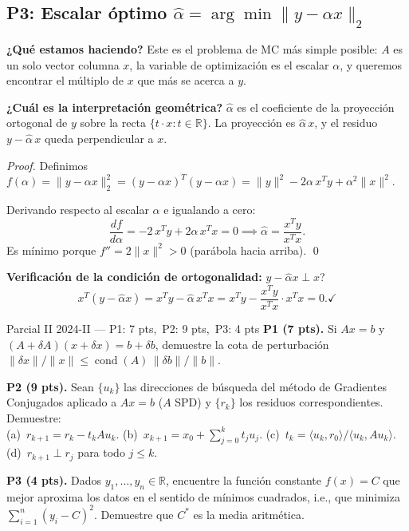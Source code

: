 \documentclass[11pt,a4paper]{article}
\begin{document}
\subsection{P3: Escalar óptimo $\hat\alpha = \arg\min\|y-\alpha x\|_2$}
\label{sec:q2_2024_p3}

\textbf{¿Qué estamos haciendo?} Este es el problema de MC más simple posible: $A$ es un solo vector columna $x$, la variable de optimización es el escalar $\alpha$, y queremos encontrar el múltiplo de $x$ que más se acerca a $y$.

\textbf{¿Cuál es la interpretación geométrica?} $\hat\alpha$ es el coeficiente de la proyección ortogonal de $y$ sobre la recta $\{t\cdot x : t\in\mathbb{R}\}$. La proyección es $\hat\alpha\, x$, y el residuo $y-\hat\alpha\, x$ queda perpendicular a $x$.

\begin{proof}
Definimos $f(\alpha)=\|y-\alpha x\|_2^2=(y-\alpha x)^T(y-\alpha x)=\|y\|^2-2\alpha\,x^Ty+\alpha^2\|x\|^2$.

Derivando respecto al escalar $\alpha$ e igualando a cero:
\[
  \frac{df}{d\alpha} = -2\,x^Ty + 2\alpha\,x^Tx = 0
  \implies \hat\alpha = \frac{x^Ty}{x^Tx}.
\]
Es mínimo porque $f''=2\|x\|^2>0$ (parábola hacia arriba). \qed
\end{proof}

\textbf{Verificación de la condición de ortogonalidad:} $y-\hat\alpha x\perp x$?
\[
  x^T(y-\hat\alpha x) = x^Ty - \hat\alpha\,x^Tx = x^Ty - \frac{x^Ty}{x^Tx}\cdot x^Tx = 0. \checkmark
\]

\medskip
\begin{examen}{Parcial II 2024-II --- P1: 7 pts,\ P2: 9 pts,\ P3: 4 pts}
\textbf{P1 (7 pts).} Si $Ax=b$ y $(A+\delta A)(x+\delta x)=b+\delta b$, demuestre la cota de perturbación $\|\delta x\|/\|x\|\le\operatorname{cond}(A)\,\|\delta b\|/\|b\|$.

\smallskip\textbf{P2 (9 pts).} Sean $\{u_k\}$ las direcciones de búsqueda del método de Gradientes Conjugados aplicado a $Ax=b$ ($A$ SPD) y $\{r_k\}$ los residuos correspondientes. Demuestre:\\
(a)\ $r_{k+1}=r_k-t_kAu_k$.\quad
(b)\ $x_{k+1}=x_0+\displaystyle\sum_{j=0}^k t_ju_j$.\quad
(c)\ $t_k=\langle u_k,r_0\rangle/\langle u_k,Au_k\rangle$.\quad
(d)\ $r_{k+1}\perp r_j$ para todo $j\le k$.

\smallskip\textbf{P3 (4 pts).} Dados $y_1,\ldots,y_n\in\mathbb{R}$, encuentre la función constante $f(x)=C$ que mejor aproxima los datos en el sentido de mínimos cuadrados, i.e., que minimiza $\sum_{i=1}^n(y_i-C)^2$. Demuestre que $C^*$ es la media aritmética.
\end{examen}
\end{document}
